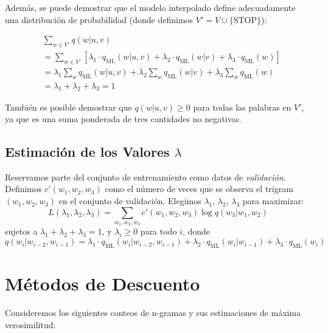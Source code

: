 Además, se puede demostrar que el modelo interpolado define adecuadamente una distribución de probabilidad (donde definimos $V' = V \cup \{\text{STOP}\}$):

\[
\begin{aligned}
    & \sum_{w \in V'} q(w | u, v) \\
    &= \sum_{w \in V'} [\lambda_1 \cdot q_{\text{ML}}(w | u, v) + \lambda_2 \cdot q_{\text{ML}}(w | v) + \lambda_3 \cdot q_{\text{ML}}(w)] \\
    &= \lambda_1 \sum_{w} q_{\text{ML}}(w | u, v) + \lambda_2 \sum_{w} q_{\text{ML}}(w | v) + \lambda_3 \sum_{w} q_{\text{ML}}(w) \\
    &= \lambda_1 + \lambda_2 + \lambda_3 = 1
\end{aligned}
\]

También es posible demostrar que $q(w | u, v) \geq 0$ para todas las palabras en $V'$, ya que es una suma ponderada de tres cantidades no negativas.



\subsection{Estimación de los Valores $\lambda$}
Reservamos parte del conjunto de entrenamiento como datos de \textit{validación}. Definimos $c'(w_1, w_2, w_3)$ como el número de veces que se observa el trigram $(w_1, w_2, w_3)$ en el conjunto de validación. Elegimos $\lambda_1$, $\lambda_2$, $\lambda_3$ para maximizar:
    \[
    L(\lambda_1, \lambda_2, \lambda_3) = \sum_{w_1,w_2,w_3} c'(w_1, w_2, w_3) \log q(w_3 | w_1, w_2)
    \]
    sujetos a $\lambda_1 + \lambda_2 + \lambda_3 = 1$, y $\lambda_i \geq 0$ para todo $i$, donde
    \[
    q(w_i | w_{i-2}, w_{i-1}) = \lambda_1 \cdot q_{\text{ML}}(w_i | w_{i-2}, w_{i-1}) + \lambda_2 \cdot q_{\text{ML}}(w_i | w_{i-1}) + \lambda_3 \cdot q_{\text{ML}}(w_i)
    \]

\section{Métodos de Descuento}

Consideremos los siguientes conteos de n-gramas y sus estimaciones de máxima verosimilitud:


